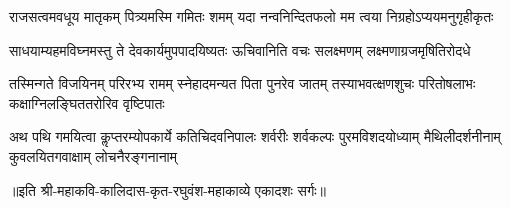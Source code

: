 \fourlineindentedshloka
{राजसत्वमवधूय मातृकम्}
{पित्र्यमस्मि गमितः शमम् यदा}
{नन्वनिन्दितफलो मम त्वया}
{निग्रहोऽप्ययमनुगृहीकृतः} %

\fourlineindentedshloka
{साधयाम्यहमविघ्नमस्तु ते}
{देवकार्यमुपपादयिष्यतः}
{ऊचिवानिति वचः सलक्ष्मणम्}
{लक्ष्मणाग्रजमृषितिरोदधे} %

\fourlineindentedshloka
{तस्मिन्गते विजयिनम् परिरभ्य रामम्}
{स्नेहादमन्यत पिता पुनरेव जातम्}
{तस्याभवत्क्षणशुचः परितोषलाभः}
{कक्षाग्निलङ्घिततरोरिव वृष्टिपातः} %

\fourlineindentedshloka
{अथ पथि गमयित्वा कॢप्तरम्योपकार्ये}
{कतिचिदवनिपालः शर्वरीः शर्वकल्पः}
{पुरमविशदयोध्याम् मैथिलीदर्शनीनाम्}
{कुवलयितगवाक्षाम् लोचनैरङ्गनानाम्} %

॥इति श्री-महाकवि-कालिदास-कृत-रघुवंश-महाकाव्ये एकादशः सर्गः॥
